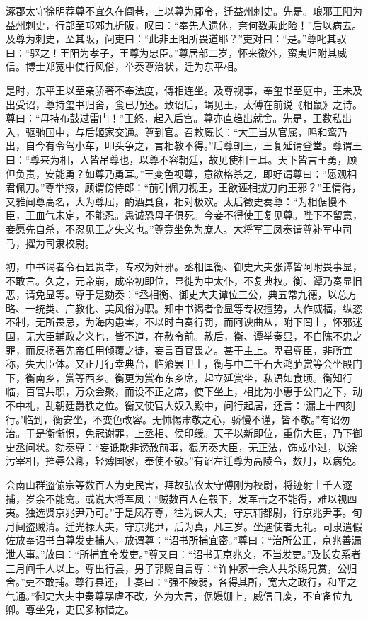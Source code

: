 \documentclass[12pt,UTF8]{ctexbook}
\begin{document}
涿郡太守徐明荐尊不宜久在闾巷，上以尊为郿令，迁益州刺史。先是。琅邪王阳为益州刺史，行部至邛郲九折阪，叹曰：“奉先人遗体，奈何数乘此险！”后以病去。及尊为刺史，至其阪，问吏曰：“此非王阳所畏道耶？”吏对曰：“是。”尊叱其驭曰：“驱之！王阳为孝子，王尊为忠臣。”尊居部二岁，怀来徼外，蛮夷归附其威信。博士郑宽中使行风俗，举奏尊治状，迁为东平相。



是时，东平王以至亲骄奢不奉法度，傅相连坐。及尊视事，奉玺书至庭中，王未及出受诏，尊持玺书归舍，食已乃还。致诏后，竭见王，太傅在前说《相鼠》之诗。尊曰：“毋持布鼓过雷门！”王怒，起入后宫。尊亦直趋出就舍。先是，王数私出入，驱驰国中，与后姬家交通。尊到官。召敕厩长：“大王当从官属，鸣和鸾乃出，自今有令驾小车，叩头争之，言相教不得。”后尊朝王，王复延请登堂。尊谓王曰：“尊来为相，人皆吊尊也，以尊不容朝廷，故见使相王耳。天下皆言王勇，顾但负责，安能勇？如尊乃勇耳。”王变色视尊，意欲格杀之，即好谓尊曰：“愿观相君佩刀。”尊举掖，顾谓傍侍郎：“前引佩刀视王，王欲诬相拔刀向王邪？”王情得，又雅闻尊高名，大为尊屈，酌酒具食，相对极欢。太后徵史奏尊：“为相倨慢不臣，王血气未定，不能忍。愚诚恐母子俱死。今妾不得使王复见尊。陛下不留意，妾愿先自杀，不忍见王之失义也。”尊竟坐免为庶人。大将军王凤奏请尊补军中司马，擢为司隶校尉。



初，中书谒者令石显贵幸，专权为奸邪。丞相匡衡、御史大夫张谭皆阿附畏事显，不敢言。久之，元帝崩，成帝初即位，显徙为中太仆，不复典权。衡、谭乃奏显旧恶，请免显等。尊于是劾奏：“丞相衡、御史大夫谭位三公，典五常九德，以总方略、一统类、广教化、美风俗为职。知中书谒者令显等专权擅势，大作威福，纵恣不制，无所畏忌，为海内患害，不以时白奏行罚，而阿谀曲从，附下罔上，怀邪迷国，无大臣辅政之义也，皆不道，在赦令前。赦后，衡、谭举奏显，不自陈不忠之罪，而反扬著先帝任用倾覆之徒，妄言百官畏之。甚于主上。卑君尊臣，非所宜称，失大臣体。又正月行幸典台，临飨罢卫士，衡与中二千石大鸿胪赏等会坐殿门下，衡南乡，赏等西乡。衡更为赏布东乡席，起立延赏坐，私语如食顷。衡知行临，百官共职，万众会聚，而设不正之席，使下坐上，相比为小惠于公门之下，动不中礼，乱朝廷爵秩之位。衡又使官大奴入殿中，问行起居，还言：‘漏上十四刻行。’临到，衡安坐，不变色改容。无怵惕肃敬之心，骄慢不谨，皆不敬。”有诏勿治。于是衡惭惧，免冠谢罪，上丞相、侯印绶。天子以新即位，重伤大臣，乃下御史丞问状。劾奏尊：“妄诋欺非谤赦前事，猥历奏大臣，无正法，饰成小过，以涂污宰相，摧辱公卿，轻薄国家，奉使不敬。”有诏左迁尊为高陵令，数月，以病免。



会南山群盗傰宗等数百人为吏民害，拜故弘农太守傅刚为校尉，将迹射士千人逐捕，岁余不能禽。或说大将军凤：“贼数百人在毂下，发军击之不能得，难以视四夷。独选贤京兆尹乃可。”于是凤荐尊，往为谏大夫，守京辅都尉，行京兆尹事。旬月间盗贼清。迁光禄大夫，守京兆尹，后为真，凡三岁。坐遇使者无礼。司隶遣假佐放奉诏书白尊发吏捕人，放谓尊：“诏书所捕宜密。”尊曰：“治所公正，京兆善漏泄人事。”放曰：“所捕宜令发吏。”尊又曰：“诏书无京兆文，不当发吏。”及长安系者三月间千人以上。尊出行县，男子郭赐自言尊：“许仲家十余人共杀赐兄赏，公归舍。”吏不敢捕。尊行县还，上奏曰：“强不陵弱，各得其所，宽大之政行，和平之气通。”御史大夫中奏尊暴虐不改，外为大言，倨嫚姗上，威信日废，不宜备位九卿。尊坐免，吏民多称惜之。
\end{document}

